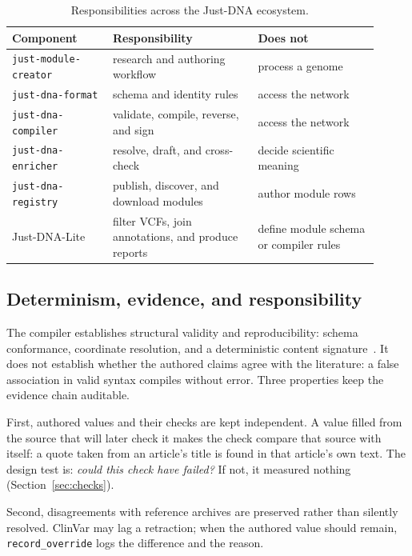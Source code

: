 \documentclass[11pt,a4paper]{article}
\begin{document}
\begin{table}[ht]
\centering
\caption{Responsibilities across the Just-DNA ecosystem.}
\label{tab:packages}
\begin{tabular}{@{}p{0.25\linewidth}p{0.36\linewidth}p{0.30\linewidth}@{}}
\toprule
Component & Responsibility & Does not \\
\midrule
\texttt{just-module-creator} & research and authoring workflow & process a genome \\
\texttt{just-dna-format} & schema and identity rules & access the network \\
\texttt{just-dna-compiler} & validate, compile, reverse, and sign & access the network \\
\texttt{just-dna-enricher} & resolve, draft, and cross-check & decide scientific meaning \\
\texttt{just-dna-registry} & publish, discover, and download modules & author module rows \\
Just-DNA-Lite & filter VCFs, join annotations, and produce reports & define module schema or compiler rules \\
\bottomrule
\end{tabular}
\end{table}

\subsection{Determinism, evidence, and responsibility}

The compiler establishes structural validity and reproducibility: schema
conformance, coordinate resolution, and a deterministic content
signature~\citep{justdnaformat2026}. It does not establish whether the authored
claims agree with the literature: a false association in valid syntax
compiles without error. Three properties keep the evidence chain auditable.

First, authored values and their checks are kept independent. A value filled
from the source that will later check it makes the check compare that source
with itself: a quote taken from an article's title is found in that
article's own text. The design test is: \emph{could this check have failed?} If not,
it measured nothing (Section~\ref{sec:checks}).

Second, disagreements with reference archives are preserved rather than
silently resolved. ClinVar may lag a retraction; when the authored value
should remain, \texttt{record\_override} logs the difference and the reason.
\end{document}

